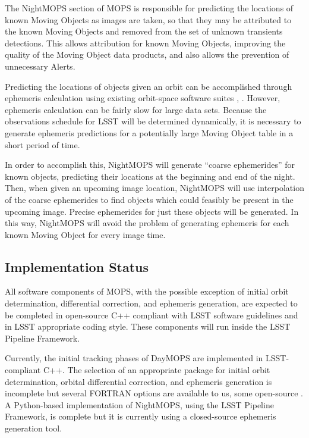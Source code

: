 \documentclass[12pt,preprint]{aastex}
\begin{document}
The NightMOPS section of MOPS is responsible for predicting the
locations of known Moving Objects as images are taken, so that they
may be attributed to the known Moving Objects and removed from the set
of unknown transients detections.  This allows attribution for known
Moving Objects, improving the quality of the Moving Object data
products, and also allows the prevention of unnecessary Alerts.

Predicting the locations of objects given an orbit can be accomplished
through ephemeris calculation using existing orbit-space software
suites \citep{Milani2006}, \citep{OpenOrb2009}.  However, ephemeris
calculation can be fairly slow for large data sets.  Because the
observations schedule for LSST will be determined dynamically, it is
necessary to generate ephemeris predictions for a potentially large
Moving Object table in a short period of time.


In order to accomplish this, NightMOPS will generate ``coarse
ephemerides'' for known objects, predicting their locations at the
beginning and end of the night.  Then, when given an upcoming image
location, NightMOPS will use interpolation of the coarse ephemerides
to find objects which could feasibly be present in the upcoming
image. Precise ephemerides for just these objects will be
generated. In this way, NightMOPS will avoid the problem of generating
ephemeris for each known Moving Object for every image time.


\subsection{Implementation Status}

All software components of MOPS, with the possible exception of
initial orbit determination, differential correction, and ephemeris
generation, are expected to be completed in open-source C++ compliant
with LSST software guidelines and in LSST appropriate coding style.
These components will run inside the LSST Pipeline Framework.

Currently, the initial tracking phases of DayMOPS are implemented in
LSST-compliant C++.  The selection of an appropriate package for
initial orbit determination, orbital differential correction, and
ephemeris generation is incomplete but several FORTRAN options are
available to us, some open-source \citep{Milano2006}
\citep{OpenOrb2009}.  A Python-based implementation of NightMOPS,
using the LSST Pipeline Framework, is complete but it is currently
using a closed-source ephemeris generation tool.
\end{document}
